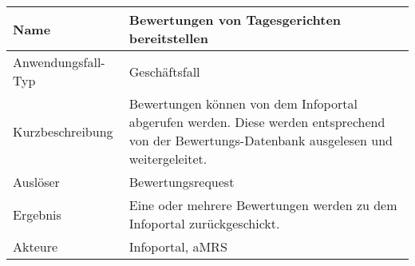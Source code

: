 \begin{table}[H]
    \centering
    \label{bewertungenbereitstellen}
    \begin{tabularx}{\textwidth}{| l | X |}
        \hline
        Name               & Bewertungen von Tagesgerichten bereitstellen                                                                                                  \\
        \hline
        Anwendungsfall-Typ & Geschäftsfall                                                                                                                                 \\
        \hline
        Kurzbeschreibung   & Bewertungen können von dem Infoportal abgerufen werden. Diese werden entsprechend von der Bewertungs-Datenbank ausgelesen und weitergeleitet. \\
        \hline
        Auslöser           & Bewertungsrequest                                                                                                                             \\
        \hline
        Ergebnis           & Eine oder mehrere Bewertungen werden zu dem Infoportal zurückgeschickt.                                                                       \\
        \hline
        Akteure            & Infoportal, \ac{aMRS}                                                                                                                         \\
        \hline
    \end{tabularx}
\end{table}

